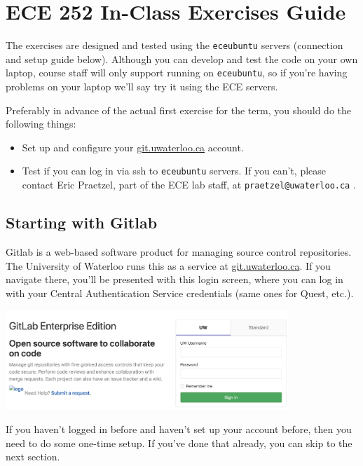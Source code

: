 



\section*{ECE 252 In-Class Exercises Guide}

The exercises are designed and tested using the \texttt{eceubuntu} servers (connection and setup guide below). Although you can develop and test the code on your own laptop, course staff will only support running on \texttt{eceubuntu}, so if you're having problems on your laptop we'll say try it using the ECE servers.

Preferably in advance of the actual first exercise for the term, you should do the following things:
\begin{itemize}
	\item Set up and configure your \url{git.uwaterloo.ca} account.
	\item Test if you can log in via ssh to \texttt{eceubuntu} servers. If you can't, please contact Eric Praetzel, part of the ECE lab staff,  at \texttt{praetzel@uwaterloo.ca} .
\end{itemize}

\subsection*{Starting with Gitlab}
Gitlab is a web-based software product for managing source control repositories. The University of Waterloo runs this as a service at \url{git.uwaterloo.ca}. If you navigate there, you'll be presented with this login screen, where you can log in with your Central Authentication Service credentials (same ones for Quest, etc.).

\begin{center}
	\includegraphics[width=0.8\textwidth]{images/gitlab-login.png}
\end{center}

If you haven't logged in before and haven't set up your account before, then you need to do some one-time setup. If you've done that already, you can skip to the next section.


